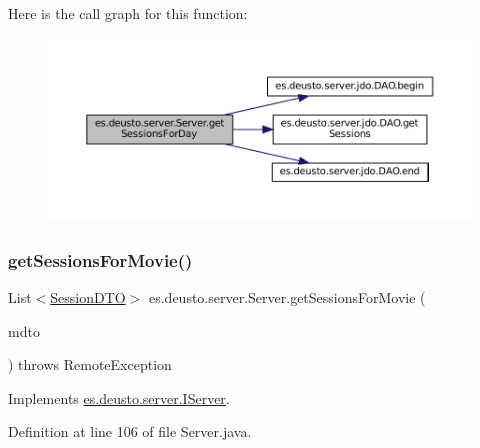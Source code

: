 Here is the call graph for this function\+:
\nopagebreak
\begin{figure}[H]
\begin{center}
\leavevmode
\includegraphics[width=350pt]{classes_1_1deusto_1_1server_1_1_server_a688ca336b3cbdb5c04ecdc4f23ff65d1_cgraph}
\end{center}
\end{figure}
\mbox{\label{classes_1_1deusto_1_1server_1_1_server_a33a6671bb4dc4bd9e23df10e53e5632d}} 
\subsubsection{\texorpdfstring{getSessionsForMovie()}{getSessionsForMovie()}}
{\footnotesize\ttfamily List$<$\mbox{\hyperlink{classes_1_1deusto_1_1server_1_1data_1_1_session_d_t_o}{Session\+D\+TO}}$>$ es.\+deusto.\+server.\+Server.\+get\+Sessions\+For\+Movie (\begin{DoxyParamCaption}\item[{\mbox{\hyperlink{classes_1_1deusto_1_1server_1_1data_1_1_movie_d_t_o}{Movie\+D\+TO}}}]{mdto }\end{DoxyParamCaption}) throws Remote\+Exception}



Implements \mbox{\hyperlink{interfacees_1_1deusto_1_1server_1_1_i_server_a33dc65de2a567be10bf2477ee28765f8}{es.\+deusto.\+server.\+I\+Server}}.



Definition at line 106 of file Server.\+java.

